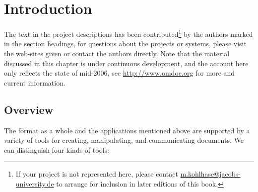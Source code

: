 
\chapter{Introduction}\label{chapx:projeccts-intro}
The text in the project descriptions has been contributed\footnote{If your {\omdoc}
  project is not represented here, please contact \url{m.kohlhase@jacobs-university.de} to
  arrange for inclusion in later editions of this book.} by the authors marked in the
section headings, for questions about the projects or systems, please visit the web-sites
given or contact the authors directly. Note that the material discussed in this chapter is
under continuous development, and the account here only reflects the state of mid-2006,
see \url{http://www.omdoc.org} for more and current information.


\section{Overview}\label{subsec:projects-overview}
The {\omdoc} format as a whole and the applications mentioned above are supported by a
variety of tools for creating, manipulating, and communicating {\omdoc} documents. We can
distinguish four kinds of tools:

